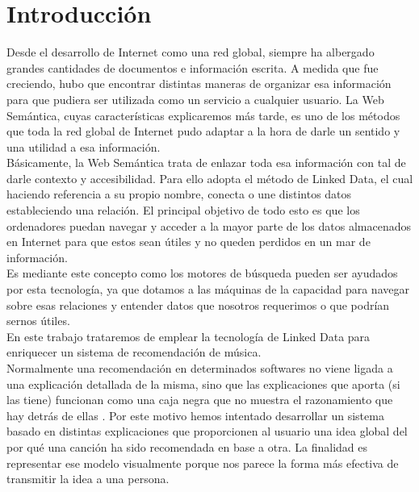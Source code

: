 \chapter{Introducción}
\label{cap:introduccion}

Desde el desarrollo de Internet como una red global, siempre ha albergado grandes cantidades de documentos e información escrita. A medida que fue creciendo, hubo que encontrar distintas maneras de organizar esa información para que pudiera ser utilizada como un servicio a cualquier usuario. La Web Semántica, cuyas características explicaremos más tarde, es uno de los métodos que toda la red global de Internet pudo adaptar a la hora de darle un sentido y una utilidad a esa información.\\

Básicamente, la Web Semántica trata de enlazar toda esa información con tal de darle contexto y accesibilidad. Para ello adopta el método de Linked Data, el cual haciendo referencia a su propio nombre, conecta o une distintos datos estableciendo una relación. El principal objetivo de todo esto es que los ordenadores puedan navegar y acceder a la mayor parte de los datos almacenados en Internet para que estos sean útiles y no queden perdidos en un mar de información.\\

Es mediante este concepto como los motores de búsqueda pueden ser ayudados por esta tecnología, ya que dotamos a las máquinas de la capacidad para navegar sobre esas relaciones y entender datos que nosotros requerimos o que podrían sernos útiles.\\

En este trabajo trataremos de emplear la tecnología de Linked Data para enriquecer un sistema de recomendación de música.\\

Normalmente una recomendación en determinados softwares no viene ligada a una explicación detallada de la misma, sino que las explicaciones que aporta (si las tiene) funcionan como una caja negra que no muestra el razonamiento que hay detrás de ellas \cite{tintarev2011}. Por este motivo hemos intentado desarrollar un sistema basado en distintas explicaciones que proporcionen al usuario una idea global del por qué una canción ha sido recomendada en base a otra. La finalidad es representar ese modelo visualmente porque nos parece la forma más efectiva de transmitir la idea a una persona.\\

\clearpage

